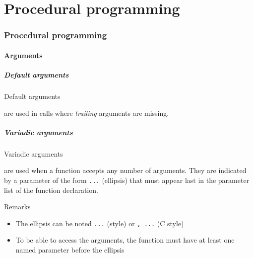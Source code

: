 \part{Procedural programming}
\label{part:proc}

\section{Procedural programming}


\subsection{Arguments}

\subsubsection{Default arguments}

\begin{frame}{Default arguments}{}
  \begin{definition}
     are used in calls where \emph{trailing} arguments are missing.
  \end{definition}

  \begin{example}
  \end{example}
\end{frame}

\subsubsection{Variadic arguments}

\begin{frame}{Variadic arguments}{}
  \begin{definition}
     are used when a function accepts any number of arguments. They are indicated by a parameter of the form \lstinline!...! (ellipsis) that must appear last in the parameter list of the function declaration.
  \end{definition}

  \begin{block}{Remarks}
    \begin{itemize}
    \item
      The ellipsis can be noted \lstinline!...! (\CCLang style) or \lstinline!, ...! (C style)
      \smallskip
    \item
      To be able to access the arguments, the function must have at least one named parameter before the ellipsis
    \end{itemize}
  \end{block}
\end{frame}

